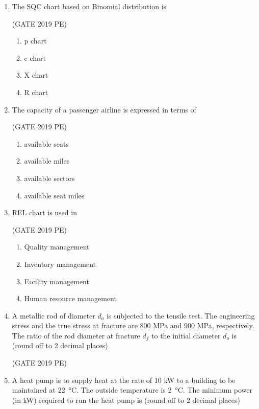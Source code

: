 \documentclass[journal,12pt,onecolumn]{exam}
\theoremstyle{remark}
\begin{document}
\begin{enumerate}
\begin{enumerate}
     \end{enumerate}
  \item The SQC chart based on Binomial distribution is

     \hfill{(GATE 2019 PE)}\\
     \begin{enumerate}
         \item p chart
         \item c chart
         \item X chart
         \item R chart
     \end{enumerate}
    \item The capacity of a passenger airline is expressed in terms of 
    
    \hfill{(GATE 2019 PE)}\\
    \begin{enumerate}
        \item available seats
        \item available miles
        \item available sectors 
        \item available seat miles
    \end{enumerate}
     \item REL chart is used in  

    \hfill{(GATE 2019 PE)}\\
\begin{enumerate}
    \item  Quality management
    \item Inventory management
    \item Facility management 
    \item Human resource management
\end{enumerate}

    \item A metallic rod of diameter \(d_o\) is subjected to the tensile test. The engineering stress and the true stress at fracture are 800 MPa and 900 MPa, respectively. The ratio of the rod diameter at fracture \(d_f\) to the initial diameter \(d_o\) is  
    (round off to 2 decimal places)

    \hfill{(GATE 2019 PE)}\\

    \item A heat pump is to supply heat at the rate of 10 kW to a building to be maintained at 22~°C. The outside temperature is 2~°C. The minimum power (in kW) required to run the heat pump is  
    (round off to 2 decimal places)


\end{enumerate}
\end{document}
